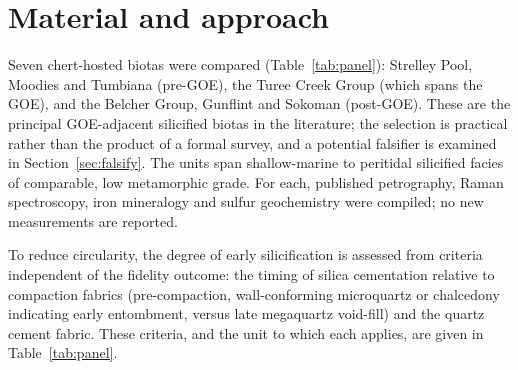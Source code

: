 \documentclass[11pt]{article}
\begin{document}
\section{Material and approach}

Seven chert-hosted biotas were compared (Table~\ref{tab:panel}): Strelley Pool, Moodies and Tumbiana
(pre-GOE), the Turee Creek Group (which spans the GOE), and the Belcher Group, Gunflint and Sokoman
(post-GOE). These are the principal GOE-adjacent silicified biotas in the literature; the selection
is practical rather than the product of a formal survey, and a potential falsifier is examined in
Section~\ref{sec:falsify}. The units span shallow-marine to peritidal silicified facies of comparable,
low metamorphic grade. For each, published petrography, Raman spectroscopy, iron mineralogy and
sulfur geochemistry were compiled; no new measurements are reported.

To reduce circularity, the degree of early silicification is assessed from criteria independent of
the fidelity outcome: the timing of silica cementation relative to compaction fabrics (pre-compaction,
wall-conforming microquartz or chalcedony indicating early entombment, versus late megaquartz
void-fill) and the quartz cement fabric. These criteria, and the unit to which each applies, are
given in Table~\ref{tab:panel}.
\end{document}
